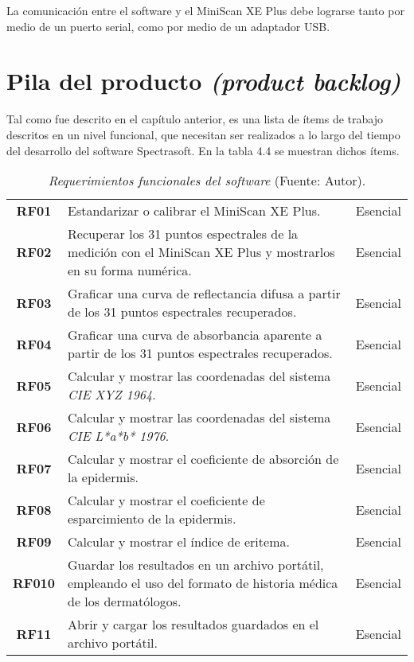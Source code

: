 	La comunicaci\'{o}n entre el software y el MiniScan XE Plus debe lograrse tanto por medio de un puerto serial, como por medio de un adaptador USB.
	
\section{Pila del producto \textit{(product backlog)}}
	Tal como fue descrito en el cap\'{i}tulo anterior, es una lista de \'{i}tems de trabajo descritos en un nivel funcional, que necesitan ser realizados a lo largo del tiempo del desarrollo del software Spectrasoft. En la tabla 4.4 se muestran dichos \'{i}tems.
	
	\begin{table}[h]
		\small
		\caption[Requerimientos funcionales del software]{\textit{Requerimientos funcionales del software} (Fuente: Autor).}
		\centering
		\setlength{\extrarowheight}{\altocelda}
		\begin{tabulary}{\anchotabla}{|c|J|c|}
			\hline
			 &  & \\ \hline
			
			\textbf{RF01} & Estandarizar o calibrar el MiniScan XE Plus. & Esencial\\ \hline
			
			\textbf{RF02} & Recuperar los 31 puntos espectrales de la medici\'{o}n con el MiniScan XE Plus y mostrarlos en su forma num\'{e}rica. & Esencial\\ \hline

			\textbf{RF03} & Graficar una curva de reflectancia difusa a partir de los 31 puntos espectrales recuperados. & Esencial\\ \hline
			\textbf{RF04} & Graficar una curva de absorbancia aparente a partir de los 31 puntos espectrales recuperados. & Esencial\\ \hline
			\textbf{RF05} & Calcular y mostrar las coordenadas del sistema \textit{CIE XYZ 1964}. & Esencial\\ \hline
			\textbf{RF06} & Calcular y mostrar las coordenadas del sistema \textit{CIE L*a*b* 1976}. & Esencial\\ \hline
			\textbf{RF07} & Calcular y mostrar el coeficiente de absorci\'{o}n de la epidermis. & Esencial\\ \hline
			\textbf{RF08} & Calcular y mostrar el coeficiente de esparcimiento de la epidermis. & Esencial\\ \hline
			\textbf{RF09} & Calcular y mostrar el \'{i}ndice de eritema. & Esencial\\ \hline
			\textbf{RF010} & Guardar los resultados en un archivo port\'{a}til, empleando el uso del formato de historia m\'{e}dica de los dermat\'{o}logos. & Esencial\\ \hline
			\textbf{RF11} & Abrir y cargar los resultados guardados en el archivo port\'{a}til. & Esencial\\ \hline
		\end{tabulary}
	\end{table}
	
